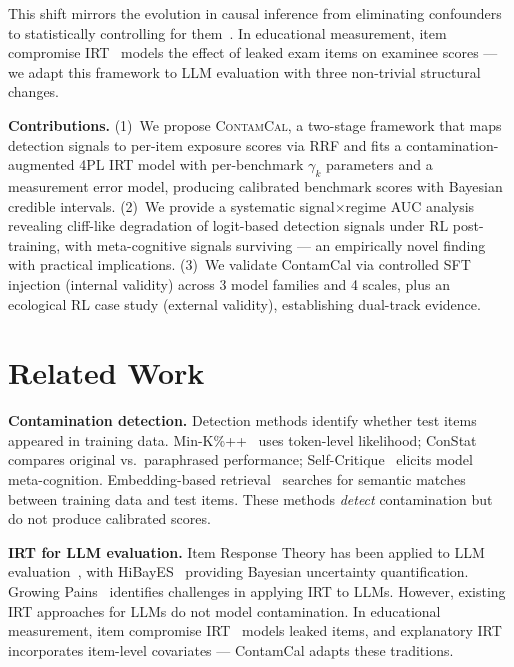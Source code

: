 \documentclass[letterpaper]{article}
\begin{document}
This shift mirrors the evolution in causal inference from eliminating confounders to statistically controlling for them~\citep{rosenbaum1983central}.
In educational measurement, item compromise IRT~\citep{eckerly2017detecting,sinharay2017detection} models the effect of leaked exam items on examinee scores --- we adapt this framework to LLM evaluation with three non-trivial structural changes.

\textbf{Contributions.}
(1)~We propose \textsc{ContamCal}, a two-stage framework that maps detection signals to per-item exposure scores via RRF and fits a contamination-augmented 4PL IRT model with per-benchmark $\gamma_k$ parameters and a measurement error model, producing calibrated benchmark scores with Bayesian credible intervals.
(2)~We provide a systematic signal$\times$regime AUC analysis revealing cliff-like degradation of logit-based detection signals under RL post-training, with meta-cognitive signals surviving --- an empirically novel finding with practical implications.
(3)~We validate ContamCal via controlled SFT injection (internal validity) across 3 model families and 4 scales, plus an ecological RL case study (external validity), establishing dual-track evidence.

\section{Related Work}
\label{sec:related}

\textbf{Contamination detection.}
Detection methods identify whether test items appeared in training data.
Min-K\%++~\citep{zhang2024minkpp} uses token-level likelihood; ConStat~\citep{dekoninck2024constat} compares original vs.\ paraphrased performance; Self-Critique~\citep{wentzel2024selfcritique} elicits model meta-cognition.
Embedding-based retrieval~\citep{golchin2024time} searches for semantic matches between training data and test items.
These methods \emph{detect} contamination but do not produce calibrated scores.

\textbf{IRT for LLM evaluation.}
Item Response Theory has been applied to LLM evaluation~\citep{lalor2024benchmarking,martinez2024item}, with HiBayES~\citep{polo2024tinybenchmarks} providing Bayesian uncertainty quantification.
Growing Pains~\citep{burnell2023rethink} identifies challenges in applying IRT to LLMs.
However, existing IRT approaches for LLMs do not model contamination.
In educational measurement, item compromise IRT~\citep{eckerly2017detecting,sinharay2017detection} models leaked items, and explanatory IRT~\citep{deboeck2004explanatory} incorporates item-level covariates --- ContamCal adapts these traditions.
\end{document}
